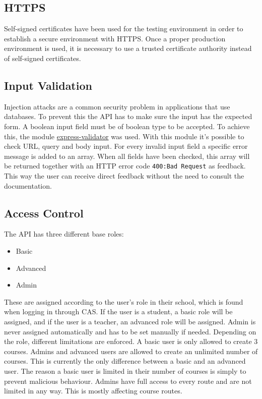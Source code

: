 \subsection{HTTPS} \label{https}
Self-signed certificates have been used for the testing environment in order to establish a secure environment with HTTPS. Once a proper production environment is used, it is necessary to use a trusted certificate authority instead of self-signed certificates.

\subsection{Input Validation}
Injection attacks are a common security problem in applications that use databases. To prevent this the API has to make sure the input has the expected form. A boolean input field must be of boolean type to be accepted. To achieve this, the module \href{https://github.com/ctavan/express-validator}{express-validator} was used. With this module it's possible to check URL, query and body input. For every invalid input field a specific error message is added to an array. When all fields have been checked, this array will be returned together with an HTTP error code \texttt{400:\@ Bad Request} as feedback. This way the user can receive direct feedback without the need to consult the documentation.

\subsection{Access Control}
The API has three different base roles:
\begin{itemize}
\item Basic
\item Advanced
\item Admin
\end{itemize}
These are assigned according to the user's role in their school, which is found when logging in through CAS. If the user is a student, a basic role will be assigned, and if the user is a teacher, an advanced role will be assigned. Admin is never assigned automatically and has to be set manually if needed. Depending on the role, different limitations are enforced. A basic user is only allowed to create 3 courses. Admins and advanced users are allowed to create an unlimited number of courses. This is currently the only difference between a basic and an advanced user. The reason a basic user is limited in their number of courses is simply to prevent malicious behaviour. Admins have full access to every route and are not limited in any way. This is mostly affecting course routes. 

